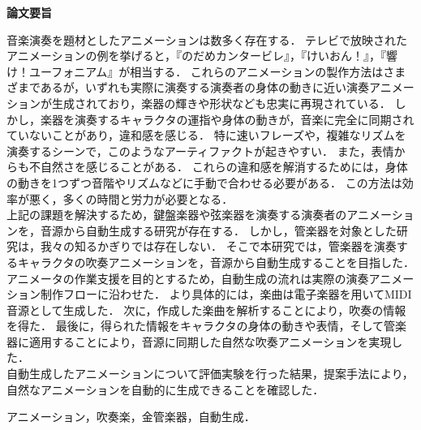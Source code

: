 \begin{center}
{\bf {\large 論文要旨}}
\end{center}

\vspace{3ex}
音楽演奏を題材としたアニメーションは数多く存在する．
テレビで放映されたアニメーションの例を挙げると，『のだめカンタービレ』，『けいおん！』，『響け！ユーフォニアム』が相当する．
これらのアニメーションの製作方法はさまざまであるが，いずれも実際に演奏する演奏者の身体の動きに近い演奏アニメーションが生成されており，楽器の輝きや形状なども忠実に再現されている．
%
しかし，楽器を演奏するキャラクタの運指や身体の動きが，音楽に完全に同期されていないことがあり，違和感を感じる．
特に速いフレーズや，複雑なリズムを演奏するシーンで，このようなアーティファクトが起きやすい．
また，表情からも不自然さを感じることがある．
これらの違和感を解消するためには，身体の動きを1つずつ音階やリズムなどに手動で合わせる必要がある．
この方法は効率が悪く，多くの時間と労力が必要となる．\\
%
\indent
上記の課題を解決するため，鍵盤楽器や弦楽器を演奏する演奏者のアニメーションを，音源から自動生成する研究が存在する．
しかし，管楽器を対象とした研究は，我々の知るかぎりでは存在しない．
そこで本研究では，管楽器を演奏するキャラクタの吹奏アニメーションを，音源から自動生成することを目指した．
アニメータの作業支援を目的とするため，自動生成の流れは実際の演奏アニメーション制作フローに沿わせた．
より具体的には，楽曲は電子楽器を用いてMIDI音源として生成した．
次に，作成した楽曲を解析することにより，吹奏の情報を得た．
最後に，得られた情報をキャラクタの身体の動きや表情，そして管楽器に適用することにより，音源に同期した自然な吹奏アニメーションを実現した．\\
%
\indent
自動生成したアニメーションについて評価実験を行った結果，提案手法により，自然なアニメーションを自動的に生成できることを確認した．

\vspace{4ex}

\noindent
{}

\noindent
アニメーション，吹奏楽，金管楽器，自動生成．